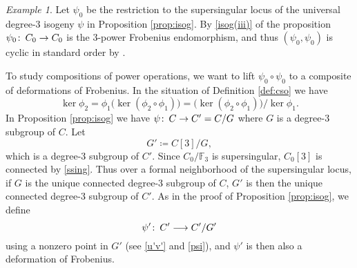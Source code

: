 \documentclass{gtpart}
\theoremstyle{definition}
\theoremstyle{remark}
\newtheorem{ex}[thm]{Example}
\def\co{\colon\thinspace}
\newcommand{\mb}[1]{\mathbb{#1}}
\newcommand{\BF}{{\mb F}}
\newcommand{\ce}{\coloneqq}
\numberwithin{equation}{section}
\numberwithin{thm}{section}
\begin{document}
\begin{ex}
\label{ex:DF}
 Let $\psi_0$ be the restriction to the supersingular locus of the 
 universal degree-3 isogeny $\psi$ in Proposition \ref{prop:isog}.  By 
 \eqref{isog(iii)} of the proposition $\psi_0 \co C_0 \to C_0$ is the 
 3-power Frobenius endomorphism, and thus $(\psi_0,\psi_0)$ is cyclic in 
 standard order by \cite[12.2.4(1)]{KM}.  

 To study compositions of power operations, we want to lift 
 $\psi_0 \circ \psi_0$ to a composite of deformations of Frobenius.  In 
 the situation of Definition \ref{def:cso} we have 
 \[
  \ker \phi_2 = \phi_1 \big( \ker(\phi_2 \circ \phi_1) \big) 
  = \big( \ker(\phi_2 \circ \phi_1) \big) \big/ \ker \phi_1.  
 \]
 In Proposition \ref{prop:isog} we have $\psi \co C \to C' = C/G$ where 
 $G$ is a degree-3 subgroup of $C$.  Let 
 \[
  G' \ce C[3]/G, 
 \]
 which is a degree-3 subgroup of $C'$.  Since $C_0/\BF_3$ is 
 supersingular, $C_0[3]$ is connected by \eqref{ssing}.  Thus over a 
 formal neighborhood of the supersingular locus, if $G$ is the unique 
 connected degree-3 subgroup of $C$, $G'$ is then the unique connected 
 degree-3 subgroup of $C'$.  As in the proof of Proposition 
 \ref{prop:isog}, we define 
 \[
  \psi' \co C' \longrightarrow C'/G' 
 \]
 using a nonzero point in $G'$ (see \eqref{u'v'} and \eqref{psi}), and 
 $\psi'$ is then also a deformation of Frobenius.  
\end{ex}
\end{document}
